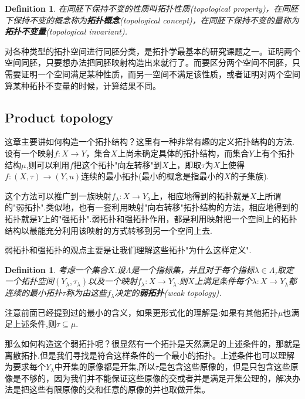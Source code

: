 \documentclass{article}
\newtheorem{definition}[theorem]{Definition}
\newcommand*{\xfunc}[4]{{#2}\colon{#3}{#1}{#4}}
\newcommand*{\func}[3]{\xfunc{\to}{#1}{#2}{#3}}
\begin{document}
\begin{definition}
在同胚下保持不变的性质叫拓扑性质(topological property)，在同胚下保持不变的概念称为\textbf{拓扑概念}(topological concept)，在同胚下保持不变的量称为\textbf{拓扑不变量}(topological invariant).
\end{definition}

对各种类型的拓扑空间进行同胚分类，是拓扑学最基本的研究课题之一。证明两个空间同胚，只要想办法把同胚映射构造出来就行了。而要区分两个空间不同胚，只需要证明一个空间满足某种性质，而另一空间不满足该性质，或者证明对两个空间算某种拓扑不变量的时候，计算结果不同。


\newpage
\subsection{Product topology}
这章主要讲如何构造一个拓扑结构？这里有一种非常有趣的定义拓扑结构的方法.设有一个映射$\func{f}{X}{Y}$，集合$X$上尚未确定具体的拓扑结构，而集合$Y$上有个拓扑结构$\mu$,则可以利用$f$把这个拓扑"向左转移"到$X$上，即取$\tau$为$X$上使得$\func{f}{(X,\tau)}{(Y,u)}$连续的最小拓扑(最小的概念是指最小的$X$的子集族).

这个方法可以推广到一族映射$\func{f_\lambda}{X}{Y_\lambda}$上，相应地得到的拓扑就是$X$上所谓的"弱拓扑".类似地，也有一套利用映射"向右转移"拓扑结构的方法，相应地得到的拓扑就是$Y$上的"强拓扑".弱拓扑和强拓扑作用，都是利用映射把一个空间上的拓扑结构以最能充分利用该映射的方式转移到另一个空间上去.

弱拓扑和强拓扑的观点主要是让我们理解这些拓扑"为什么这样定义".


\begin{definition}
考虑一个集合$X$.设$\Lambda$是一个指标集，并且对于每个指标$\lambda \in \Lambda$,取定一个拓扑空间$(Y_\lambda,\tau_\lambda)$以及一个映射$\func{f_\lambda}{X}{Y_\lambda}$.则$X$上满足条件每个$\func{\lambda}{X}{Y_\lambda}$都连续的最小拓扑$\tau$称为由这些$f_\lambda$决定的\textbf{弱拓扑}(weak topology).
\end{definition}

注意前面已经提到过的最小的含义，如果更形式化的理解是:如果有其他拓扑$\mu$也满足上述条件,则$\tau \subseteq \mu$.

那么如何构造这个弱拓扑呢？很显然有一个拓扑是天然满足的上述条件的，那就是离散拓扑.但是我们寻找是符合这样条件的一个最小的拓扑。上述条件也可以理解为要求每个$Y_\lambda$中开集的原像都是开集,所以$\tau$是包含这些原像的，但是只包含这些原像是不够的，因为我们并不能保证这些原像的交或者并是满足开集公理的，解决办法是把这些有限原像的交和任意的原像的并也取做开集。
\end{document}
